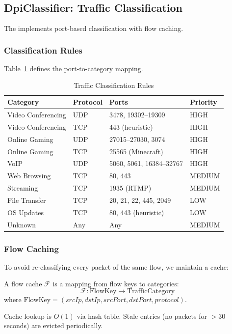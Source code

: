 \subsection{DpiClassifier: Traffic Classification}

The  implements port-based classification with flow caching.

\subsubsection{Classification Rules}

Table~\ref{tab:classification-rules} defines the port-to-category mapping.

\begin{table}[htbp]
\centering
\caption{Traffic Classification Rules}
\label{tab:classification-rules}
\small
\begin{tabular}{@{}llll@{}}
\toprule
\textbf{Category} & \textbf{Protocol} & \textbf{Ports} & \textbf{Priority} \\
\midrule
Video Conferencing & UDP & 3478, 19302–19309 & HIGH \\
Video Conferencing & TCP & 443 (heuristic) & HIGH \\
Online Gaming & UDP & 27015–27030, 3074 & HIGH \\
Online Gaming & TCP & 25565 (Minecraft) & HIGH \\
VoIP & UDP & 5060, 5061, 16384–32767 & HIGH \\
Web Browsing & TCP & 80, 443 & MEDIUM \\
Streaming & TCP & 1935 (RTMP) & MEDIUM \\
File Transfer & TCP & 20, 21, 22, 445, 2049 & LOW \\
OS Updates & TCP & 80, 443 (heuristic) & LOW \\
Unknown & Any & Any & MEDIUM \\
\bottomrule
\end{tabular}
\end{table}

\subsubsection{Flow Caching}

To avoid re-classifying every packet of the same flow, we maintain a cache:

\begin{definition}
A flow cache $\mathcal{F}$ is a mapping from flow keys to categories:
\begin{equation}
\mathcal{F}: \text{FlowKey} \to \text{TrafficCategory}
\end{equation}
where $\text{FlowKey} = (srcIp, dstIp, srcPort, dstPort, protocol)$.

Cache lookup is $O(1)$ via hash table. Stale entries (no packets for $>30$ seconds) are evicted periodically.
\end{definition}


